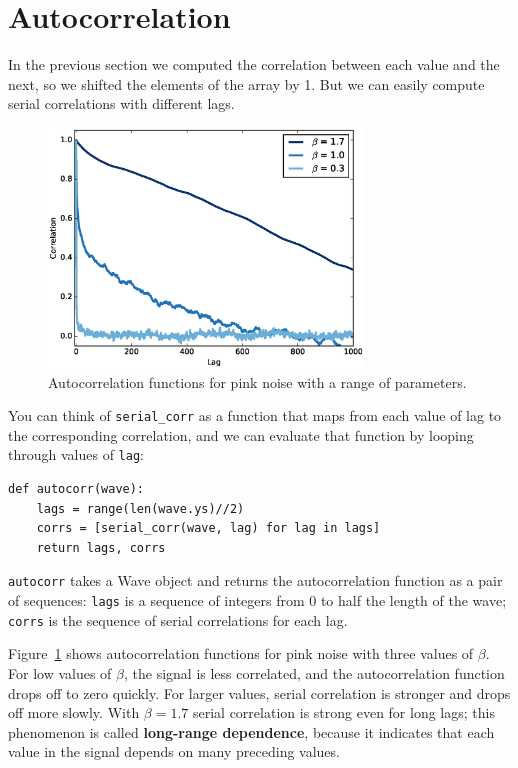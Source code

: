 \documentclass[12pt]{book}
\begin{document}
\section{Autocorrelation}
\label{autopink}

In the previous section we computed the correlation between each
value and the next, so we shifted the elements of the array by 1.
But we can easily compute serial correlations with
different lags.

\begin{figure}
\centerline{\includegraphics[height=2.5in]{figs/autocorr4.eps}}
\caption{Autocorrelation functions for pink noise with a range
of parameters.}
\label{fig.autocorr4}
\end{figure}

You can think of \verb"serial_corr" as a function that
maps from each value of lag to the corresponding correlation, and we
can evaluate that function by looping through values of {\tt lag}:

\begin{verbatim}
def autocorr(wave):
    lags = range(len(wave.ys)//2)
    corrs = [serial_corr(wave, lag) for lag in lags]
    return lags, corrs
\end{verbatim}

{\tt autocorr} takes a Wave object and returns the autocorrelation
function as a pair of sequences: {\tt lags} is a sequence of
integers from 0 to half the length of the wave; {\tt corrs}
is the sequence of serial correlations for each lag.

Figure~\ref{fig.autocorr4} shows autocorrelation functions for pink
noise with three values of $\beta$.  For low values of $\beta$, the
signal is less correlated, and the autocorrelation function drops
off to zero quickly.  For larger values, serial correlation
is stronger and drops off more slowly.  With $\beta=1.7$ serial
correlation is strong even for long lags; this phenomenon is called
{\bf long-range dependence}, because it indicates that each value in
the signal depends on many preceding values.
\end{document}
